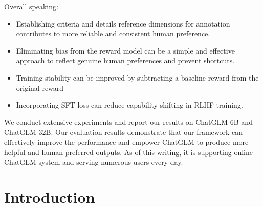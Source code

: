 {Overall speaking: 
\begin{itemize}
\item Establishing criteria and details reference dimensions for annotation contributes to more reliable and consistent human preference.
\item Eliminating bias from the reward model can be a simple and effective approach to reflect genuine human preferences and prevent shortcuts.
\item Training stability can be improved by subtracting a baseline reward from the original reward 
\item Incorporating SFT loss can reduce capability shifting in RLHF training. 
\end{itemize}


We conduct extensive experiments and report our results on ChatGLM-6B and ChatGLM-32B. Our evaluation results demonstrate that our framework can effectively improve the performance and empower ChatGLM to produce more helpful and human-preferred outputs. As of this writing, it is supporting online ChatGLM system and serving numerous users every day. 

}%

\section{Introduction}

